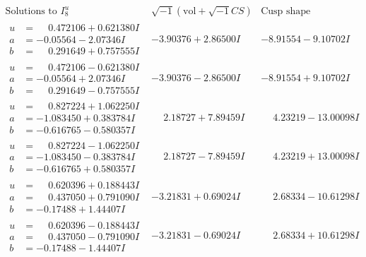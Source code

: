 \documentclass[1p]{elsarticle_modified}
\theoremstyle{definition}
\newcommand{\I}{\sqrt{-1}}
\begin{document}
$$\begin{array}{c|c|c}  
\text{Solutions to }I^u_{8}& \I (\text{vol} + \sqrt{-1}CS) & \text{Cusp shape}\\
 \hline 
\begin{aligned}
u &= \phantom{-}0.472106 + 0.621380 I \\
a &= -0.05564 - 2.07346 I \\
b &= \phantom{-}0.291649 + 0.757555 I\end{aligned}
 & -3.90376 + 2.86500 I & -8.91554 - 9.10702 I \\ \hline\begin{aligned}
u &= \phantom{-}0.472106 - 0.621380 I \\
a &= -0.05564 + 2.07346 I \\
b &= \phantom{-}0.291649 - 0.757555 I\end{aligned}
 & -3.90376 - 2.86500 I & -8.91554 + 9.10702 I \\ \hline\begin{aligned}
u &= \phantom{-}0.827224 + 1.062250 I \\
a &= -1.083450 + 0.383784 I \\
b &= -0.616765 - 0.580357 I\end{aligned}
 & \phantom{-}2.18727 + 7.89459 I & \phantom{-}4.23219 - 13.00098 I \\ \hline\begin{aligned}
u &= \phantom{-}0.827224 - 1.062250 I \\
a &= -1.083450 - 0.383784 I \\
b &= -0.616765 + 0.580357 I\end{aligned}
 & \phantom{-}2.18727 - 7.89459 I & \phantom{-}4.23219 + 13.00098 I \\ \hline\begin{aligned}
u &= \phantom{-}0.620396 + 0.188443 I \\
a &= \phantom{-}0.437050 + 0.791090 I \\
b &= -0.17488 + 1.44407 I\end{aligned}
 & -3.21831 + 0.69024 I & \phantom{-}2.68334 - 10.61298 I \\ \hline\begin{aligned}
u &= \phantom{-}0.620396 - 0.188443 I \\
a &= \phantom{-}0.437050 - 0.791090 I \\
b &= -0.17488 - 1.44407 I\end{aligned}
 & -3.21831 - 0.69024 I & \phantom{-}2.68334 + 10.61298 I \\ \hline\begin{aligned}

\end{aligned}
\end{array}$$
\end{document}
